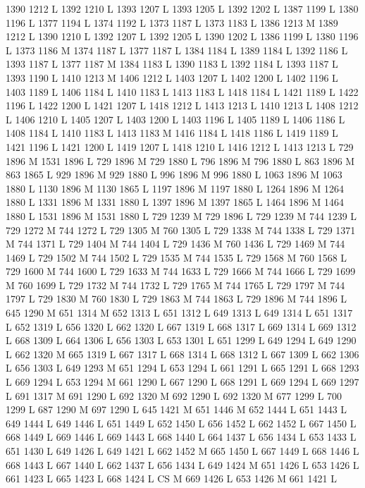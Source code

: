 {{{{{{{{{{{{{{{{{{{{{{{{1390 1212 L
1392 1210 L
1393 1207 L
1393 1205 L
1392 1202 L
1387 1199 L
1380 1196 L
1377 1194 L
1374 1192 L
1373 1187 L
1373 1183 L
1386 1213 M 1389 1212 L
1390 1210 L
1392 1207 L
1392 1205 L
1390 1202 L
1386 1199 L
1380 1196 L
1373 1186 M 1374 1187 L
1377 1187 L
1384 1184 L
1389 1184 L
1392 1186 L
1393 1187 L
1377 1187 M 1384 1183 L
1390 1183 L
1392 1184 L
1393 1187 L
1393 1190 L
1410 1213 M 1406 1212 L
1403 1207 L
1402 1200 L
1402 1196 L
1403 1189 L
1406 1184 L
1410 1183 L
1413 1183 L
1418 1184 L
1421 1189 L
1422 1196 L
1422 1200 L
1421 1207 L
1418 1212 L
1413 1213 L
1410 1213 L
1408 1212 L
1406 1210 L
1405 1207 L
1403 1200 L
1403 1196 L
1405 1189 L
1406 1186 L
1408 1184 L
1410 1183 L
1413 1183 M 1416 1184 L
1418 1186 L
1419 1189 L
1421 1196 L
1421 1200 L
1419 1207 L
1418 1210 L
1416 1212 L
1413 1213 L
729 1896 M 1531 1896 L
729 1896 M 729 1880 L
796 1896 M 796 1880 L
863 1896 M 863 1865 L
929 1896 M 929 1880 L
996 1896 M 996 1880 L
1063 1896 M 1063 1880 L
1130 1896 M 1130 1865 L
1197 1896 M 1197 1880 L
1264 1896 M 1264 1880 L
1331 1896 M 1331 1880 L
1397 1896 M 1397 1865 L
1464 1896 M 1464 1880 L
1531 1896 M 1531 1880 L
729 1239 M 729 1896 L
729 1239 M 744 1239 L
729 1272 M 744 1272 L
729 1305 M 760 1305 L
729 1338 M 744 1338 L
729 1371 M 744 1371 L
729 1404 M 744 1404 L
729 1436 M 760 1436 L
729 1469 M 744 1469 L
729 1502 M 744 1502 L
729 1535 M 744 1535 L
729 1568 M 760 1568 L
729 1600 M 744 1600 L
729 1633 M 744 1633 L
729 1666 M 744 1666 L
729 1699 M 760 1699 L
729 1732 M 744 1732 L
729 1765 M 744 1765 L
729 1797 M 744 1797 L
729 1830 M 760 1830 L
729 1863 M 744 1863 L
729 1896 M 744 1896 L
645 1290 M 651 1314 M 652 1313 L
651 1312 L
649 1313 L
649 1314 L
651 1317 L
652 1319 L
656 1320 L
662 1320 L
667 1319 L
668 1317 L
669 1314 L
669 1312 L
668 1309 L
664 1306 L
656 1303 L
653 1301 L
651 1299 L
649 1294 L
649 1290 L
662 1320 M 665 1319 L
667 1317 L
668 1314 L
668 1312 L
667 1309 L
662 1306 L
656 1303 L
649 1293 M 651 1294 L
653 1294 L
661 1291 L
665 1291 L
668 1293 L
669 1294 L
653 1294 M 661 1290 L
667 1290 L
668 1291 L
669 1294 L
669 1297 L
691 1317 M 691 1290 L
692 1320 M 692 1290 L
692 1320 M 677 1299 L
700 1299 L
687 1290 M 697 1290 L
645 1421 M 651 1446 M 652 1444 L
651 1443 L
649 1444 L
649 1446 L
651 1449 L
652 1450 L
656 1452 L
662 1452 L
667 1450 L
668 1449 L
669 1446 L
669 1443 L
668 1440 L
664 1437 L
656 1434 L
653 1433 L
651 1430 L
649 1426 L
649 1421 L
662 1452 M 665 1450 L
667 1449 L
668 1446 L
668 1443 L
667 1440 L
662 1437 L
656 1434 L
649 1424 M 651 1426 L
653 1426 L
661 1423 L
665 1423 L
668 1424 L
CS M
669 1426 L
653 1426 M 661 1421 L
}}}}}}}}}}}}}}}}}}}}}}}}
